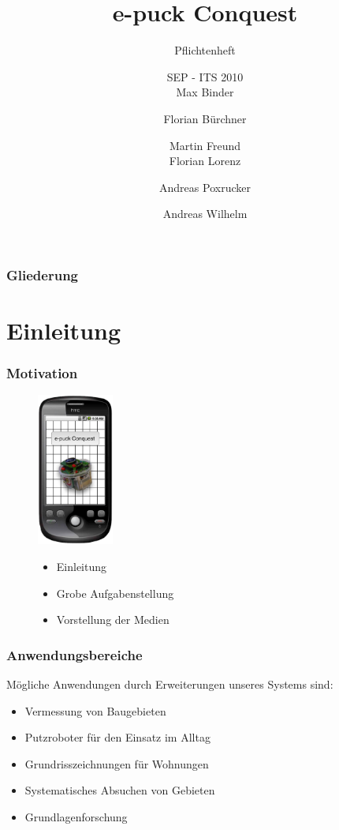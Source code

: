 \documentclass{beamer}
\title[Pflichtenheft] %
{e-puck Conquest}
\subtitle
{Pflichtenheft}
\author[Autor, Anders] %
{SEP - ITS 2010 \\ Max Binder \and Florian Bürchner \and Martin Freund
	\\ Florian Lorenz \and Andreas Poxrucker \and Andreas Wilhelm}
\institute[Universität Passau] %
{
  Fakultät für Informatik und Mathematik\\
  Universität Passau}
\begin{document}
\begin{frame}
  \titlepage
\end{frame}

\begin{frame}
  \frametitle{Gliederung}
  \tableofcontents
\end{frame}

\section{Einleitung}

\begin{frame}
  \frametitle{Motivation}
  \begin{figure}[htbp]
	\begin{minipage}[t]{5cm}
		\vspace{0pt}
		\includegraphics[height=5cm]{logo.eps} 
	\end{minipage}
	\hfill
	\begin{minipage}[t]{0.5\textwidth}
		\vspace{30pt}
		\begin{itemize}
			\item Einleitung
			\item Grobe Aufgabenstellung
			\item Vorstellung der Medien
		\end{itemize}
	\end{minipage}
   \end{figure}
\end{frame}

\begin{frame}
  \frametitle{Anwendungsbereiche}

Mögliche Anwendungen durch Erweiterungen unseres Systems sind:

	\begin{itemize}
	    \item Vermessung von Baugebieten
        \item Putzroboter für den Einsatz im Alltag
		\item Grundrisszeichnungen für Wohnungen
		\item Systematisches Absuchen von Gebieten
		\item Grundlagenforschung
	\end{itemize}

\end{frame}
\end{document}
